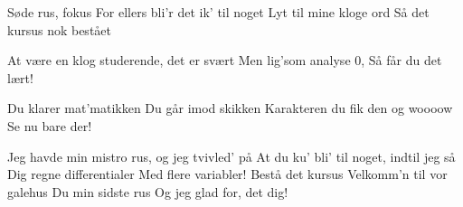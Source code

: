 \documentclass[a4paper,11pt]{article}
\begin{document}
\begin{song}
%
Søde rus, fokus
For ellers bli'r det ik' til noget
Lyt til mine kloge ord
Så det kursus nok bestået

At være en klog studerende, det er svært
Men lig'som analyse 0, 
%
 Så får du det lært!

%
Du klarer mat'matikken
Du går imod skikken
Karakteren du fik den og woooow
Se nu bare der! 

%
Jeg havde min mistro rus, og jeg tvivled' på
At du ku' bli' til noget, indtil jeg så
Dig regne differentialer
Med flere variabler!
Bestå det kursus
Velkomm'n til vor galehus
Du min sidste rus
Og jeg glad for, det dig!
\end{song}
\end{document}
